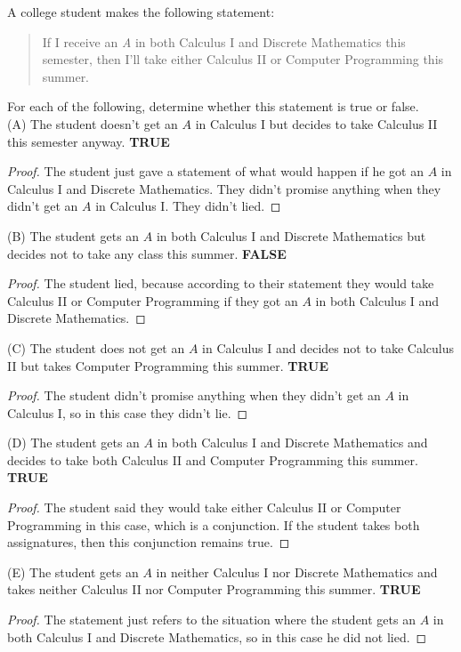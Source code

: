 \documentclass[12pt]{article}
\newenvironment{problem}[2][Problem]{\begin{trivlist}
		\item[\hskip \labelsep {\bfseries #1}\hskip \labelsep {\bfseries #2.}]}{\end{trivlist}}
\begin{document}
\begin{problem}{25}
	A college student makes the following statement:
	\begin{quote}
		If I receive an \emph{A} in both Calculus I and Discrete Mathematics this semester, then I'll take either Calculus II or Computer Programming this summer.
	\end{quote}
	For each of the following, determine whether this statement is true or false.\\
	
	(A) The student doesn't get an $A$ in Calculus I but decides to take Calculus II this semester anyway. \textbf{ TRUE}
	\begin{proof}
		The student just gave a statement of what would happen if he got an $A$ in Calculus I and Discrete Mathematics. They didn't promise anything when they didn't get an $A$ in Calculus I. They didn't lied.
	\end{proof}
	(B) The student gets an $A$ in both Calculus I and Discrete Mathematics but decides not to take any class this summer. \textbf{ FALSE}
	\begin{proof}
		The student lied, because according to their statement they would take Calculus II or Computer Programming if they got an $A$ in both Calculus I and Discrete Mathematics.
	\end{proof}
	(C) The student does not get an $A$ in Calculus I and decides not to take Calculus II but takes Computer Programming this summer. \textbf{ TRUE}
	\begin{proof}
		The student didn't promise anything when they didn't get an $A$ in Calculus I, so in this case they didn't lie.
	\end{proof}
	(D) The student gets an $A$ in both Calculus I and Discrete Mathematics and decides to take both Calculus II and Computer Programming this summer. \textbf{ TRUE}
	\begin{proof}
		The student said they would take either Calculus II or Computer Programming in this case, which is a conjunction. If the student takes both assignatures, then this conjunction remains true. 
	\end{proof}
	(E) The student gets an $A$ in neither Calculus I nor Discrete Mathematics and takes neither Calculus II nor Computer Programming this summer. \textbf{ TRUE}
	\begin{proof}
		The statement just refers to the situation where the student gets an $A$ in both Calculus I and Discrete Mathematics, so in this case he did not lied.
	\end{proof}
\end{problem}
\end{document}
